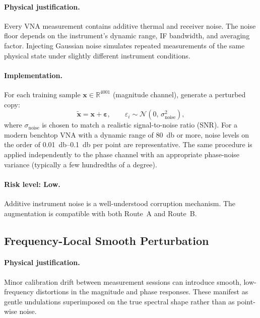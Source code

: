 \paragraph{Physical justification.}
Every VNA measurement contains additive thermal and receiver noise.
The noise floor depends on the instrument's dynamic range, IF bandwidth,
and averaging factor.  Injecting Gaussian noise simulates repeated
measurements of the same physical state under slightly different
instrument conditions.

\paragraph{Implementation.}
For each training sample $\mathbf{x} \in \mathbb{R}^{4001}$ (magnitude
channel), generate a perturbed copy:
\begin{equation}
  \tilde{\mathbf{x}} = \mathbf{x} + \boldsymbol{\varepsilon},
  \qquad
  \varepsilon_i \sim \mathcal{N}(0,\,\sigma_{\text{noise}}^{2}),
  \label{eq:gauss_noise}
\end{equation}
where $\sigma_{\text{noise}}$ is chosen to match a realistic
signal-to-noise ratio (SNR).  For a modern benchtop VNA with a dynamic
range of \SI{80}{\decibel} or more, noise levels on the order of
\SIrange{0.01}{0.1}{\decibel} per point are representative.  The same
procedure is applied independently to the phase channel with an
appropriate phase-noise variance (typically a few hundredths of a
degree).

\paragraph{Risk level: \textbf{Low}.}
Additive instrument noise is a well-understood corruption mechanism.
The augmentation is compatible with both Route~A and Route~B.

\subsection{Frequency-Local Smooth Perturbation}
\label{sec:augment:jitter}

\paragraph{Physical justification.}
Minor calibration drift between measurement sessions can introduce
smooth, low-frequency distortions in the magnitude and phase responses.
These manifest as gentle undulations superimposed on the true spectral
shape rather than as point-wise noise.

